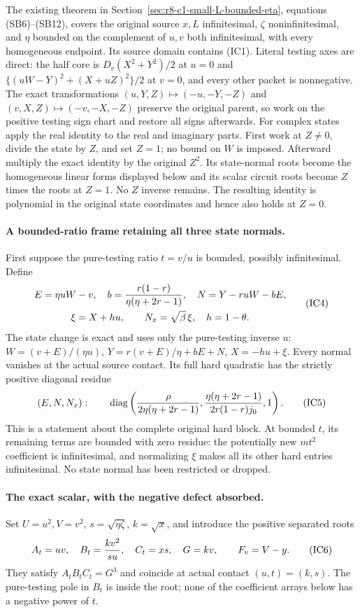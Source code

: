 The existing theorem in Section~\ref{sec:r8-c1-small-L-bounded-eta},
equations (SB6)--(SB12), covers the original source $x,L$ infinitesimal,
$\zeta$ noninfinitesimal, and $\eta$ bounded on the complement of
$u,v$ both infinitesimal, with every homogeneous endpoint. Its source
domain contains (IC1). Literal testing axes are direct: the half core
is $D_v(X^2+Y^2)/2$ at $u=0$ and
$\{(uW-Y)^2+(X+uZ)^2\}/2$ at $v=0$, and every other packet is
nonnegative. The exact transformations
$(u,Y,Z)\mapsto(-u,-Y,-Z)$ and
$(v,X,Z)\mapsto(-v,-X,-Z)$ preserve the original parent, so work on
the positive testing sign chart and restore all signs afterwards.
For complex states apply the real identity to the real and imaginary
parts. First work at $Z\ne0$, divide the state by $Z$, and set $Z=1$;
no bound on $W$ is imposed. Afterward multiply the exact identity by
the original $Z^2$. Its state-normal roots become the homogeneous
linear forms displayed below and its scalar circuit roots become
$Z$ times the roots at $Z=1$. No $Z$ inverse remains. The resulting
identity is polynomial in the original state coordinates and hence
also holds at $Z=0$.

\paragraph{A bounded-ratio frame retaining all three state normals.}
First suppose the pure-testing ratio $t=v/u$ is bounded, possibly
infinitesimal. Define
\[
 \begin{gathered}
 E=\eta uW-v,\quad
 b={r(1-r)\over\eta(\eta+2r-1)},\quad
 N=Y-ruW-bE,\\
 \xi=X+hu,\qquad N_x=\sqrt\beta\,\xi,\quad h=1-\theta.
                                                               \end{gathered} \tag{IC4}
\]
The state change is exact and uses only the pure-testing inverse $u$:
$W=(v+E)/(\eta u)$, $Y=r(v+E)/\eta+bE+N$, $X=-hu+\xi$.
Every normal vanishes at the actual source contact. Its full hard
quadratic has the strictly positive diagonal residue
\[
 (E,N,N_x):\qquad
 \operatorname{diag}\left(
 {\rho\over2\eta(\eta+2r-1)},
 {\eta(\eta+2r-1)\over2r(1-r)j_0},1\right).             \tag{IC5}
\]
This is a statement about the complete original hard block. At bounded
$t$, its remaining terms are bounded with zero residue: the potentially
new $m t^2$ coefficient is infinitesimal, and normalizing $\xi$ makes
all its other hard entries infinitesimal. No state normal has been
restricted or dropped.

\paragraph{The exact scalar, with the negative defect absorbed.}
Set $U=u^2,V=v^2$, $s=\sqrt{\eta\zeta}$, $k=\sqrt x$, and introduce
the positive separated roots
\[
 A_t=uv,\quad B_t={k v^2\over s u},\quad
 C_t=xs,\quad G=kv,\qquad F_v=V-y.
                                                               \tag{IC6}
\]
They satisfy $A_tB_tC_t=G^3$ and coincide at actual contact
$(u,t)=(k,s)$. The pure-testing pole in $B_t$ is inside the root;
none of the coefficient arrays below has a negative power of $t$.

